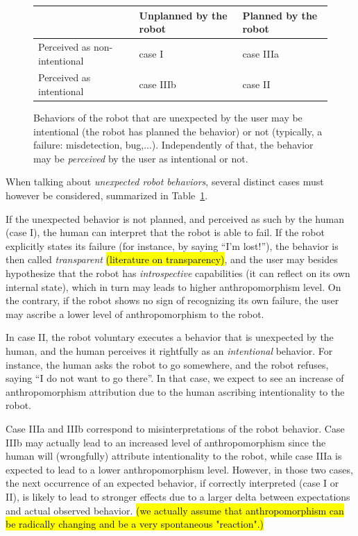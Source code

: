 \documentclass{frontiersSCNS} %
\begin{document}
\begin{figure}\footnotesize
    \centering
    \begin{tabular}{  >{\centering\arraybackslash}m{2cm} | >{\centering\arraybackslash}m{2cm} | >{\centering\arraybackslash}m{2cm} }
     & Unplanned by the robot & Planned by the robot \\ \hline
    Perceived as non-intentional & case I  & case IIIa  \\ \hline
    Perceived as intentional &  case IIIb & case II 
    \end{tabular}
\caption{
    Behaviors of the robot that are unexpected by the user may be intentional
    (the robot has planned the behavior) or not (typically, a failure:
    misdetection, bug,...). Independently of that, the behavior may be
    \emph{perceived} by the user as intentional or not.}
\label{fig:perceptionUnexpectedBehavior}
\end{figure}

When talking about \emph{unexpected robot behaviors}, several distinct cases
must however be considered, summarized in
Table~\ref{fig:perceptionUnexpectedBehavior}.

If the unexpected behavior is not planned, and perceived as such by the human
(case I), the human can interpret that the robot is able to fail. If the robot
explicitly states its failure (for instance, by saying ``I'm lost!''), the
behavior is then called \emph{transparent} 
\hl{(literature on transparency)}, and the user may besides hypothesize that the
robot has \emph{introspective} capabilities (it can reflect on its own internal
state), which in turn may leads to higher anthropomorphism level.  On the
contrary, if the robot shows no sign of recognizing its own failure, the user
may ascribe a lower level of anthropomorphism to the robot.

In case II, the robot voluntary executes a behavior that is unexpected by the
human, and the human perceives it rightfully as an \emph{intentional} behavior.
For instance, the human asks the robot to go somewhere, and the robot refuses,
saying ``I do not want to go there''. In that case, we expect to see an increase
of anthropomorphism attribution due to the human ascribing intentionality to the
robot.

Case IIIa and IIIb correspond to misinterpretations of the robot behavior. Case
IIIb may actually lead to an increased level of anthropomorphism since the human
will (wrongfully) attribute intentionality to the robot, while case IIIa is
expected to lead to a lower anthropomorphism level.  However, in those two
cases, the next occurrence of an expected behavior, if correctly interpreted
(case I or II), is likely to lead to stronger effects due to a larger delta
between expectations and actual observed behavior. \hl{(we actually assume that
anthropomorphism can be radically changing and be a very spontaneous
"reaction".)}
\end{document}
